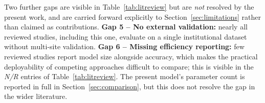 \documentclass[journal]{IEEEtran}
\newcommand{\PEND}{\textcolor{red}{\textbf{[TBD]}}}
\begin{document}
Two further gaps are visible in Table~\ref{tab:litreview} but are \emph{not}
resolved by the present work, and are carried forward explicitly to
Section~\ref{sec:limitations} rather than claimed as contributions.
\textbf{Gap 5 -- No external validation:} nearly all reviewed studies, including
this one, evaluate on a single institutional dataset without multi-site
validation. \textbf{Gap 6 -- Missing efficiency reporting:} few reviewed studies
report model size alongside accuracy, which makes the practical deployability of
competing approaches difficult to compare; this is visible in the \emph{N/R}
entries of Table~\ref{tab:litreview}. The present model's parameter count is
reported in full in Section~\ref{sec:comparison}, but this does not resolve the
gap in the wider literature.

\end{document}
